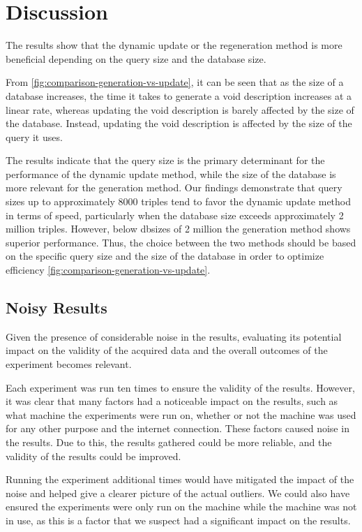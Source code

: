 \section{Discussion}\label{sec:discussion}
The results show that the dynamic update or the regeneration method is more beneficial depending on the query size and the database size.

From \autoref{fig:comparison-generation-vs-update}, it can be seen that as the size of a database increases, the time it takes to generate a \gls{void} description increases at a linear rate, whereas updating the \gls{void} description is barely affected by the size of the database. Instead, updating the \gls{void} description is affected by the size of the query it uses.


The results indicate that the query size is the primary determinant for the performance of the dynamic update method, while the size of the database is more relevant for the generation method. Our findings demonstrate that query sizes up to approximately 8000 triples tend to favor the dynamic update method in terms of speed, particularly when the database size exceeds approximately 2 million triples. However, below dbsizes of 2 million the generation method shows superior performance. Thus, the choice between the two methods should be based on the specific query size and the size of the database in order to optimize efficiency \autoref{fig:comparison-generation-vs-update}.

\subsection{Noisy Results}\label{subsec:noisy-results}
Given the presence of considerable noise in the results, evaluating its potential impact on the validity of the acquired data and the overall outcomes of the experiment becomes relevant.

Each experiment was run ten times to ensure the validity of the results. However, it was clear that many factors had a noticeable impact on the results, such as what machine the experiments were run on, whether or not the machine was used for any other purpose and the internet connection. These factors caused noise in the results. Due to this, the results gathered could be more reliable, and the validity of the results could be improved.

Running the experiment additional times would have mitigated the impact of the noise and helped give a clearer picture of the actual outliers. We could also have ensured the experiments were only run on the machine while the machine was not in use, as this is a factor that we suspect had a significant impact on the results.


